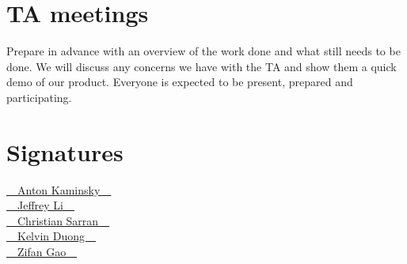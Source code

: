 \documentclass[12pt]{scrartcl}
\begin{document}
\section{TA meetings}
Prepare in advance with an overview of the work done and what still needs to be done. We will discuss any concerns we have with the TA and show them a quick demo of our product. Everyone is expected to be present, prepared and participating.

\section{Signatures}
{\Large {\ECFJD\setul{0.1ex}{}\ul{~~Anton Kaminsky~~}}}\\
{\Large {\ECFJD\setul{0.1ex}{}\ul{~~Jeffrey Li~~}}}\\
{\Large {\ECFJD\setul{0.1ex}{}\ul{~~Christian Sarran~~}}}\\
{\Large {\ECFJD\setul{0.1ex}{}\ul{~~Kelvin Duong~~}}}\\
{\Large {\ECFJD\setul{0.1ex}{}\ul{~~Zifan Gao~~}}}\\ 	
\end{document}
